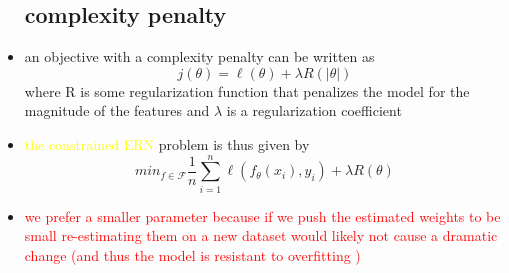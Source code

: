 \documentclass{article}
\begin{document}
\begin{itemize}
\subsection*{complexity penalty}
\item an objective with  a complexity penalty can be written as $$j(\theta)= \ell(\theta)+\lambda R(|\theta|)$$ where R is some regularization function that penalizes the model for the magnitude of the features and $\lambda $ is a regularization coefficient 
\item \textcolor{yellow}{the constrained ERN} problem is thus given by$$min_{f\in \mathcal{F}}\frac{1}{n}\sum_{i=1}^{n}\ell(f_{\theta}(x_i), y_i)+\lambda R(\theta)$$
\item \textcolor{red}{we prefer a smaller parameter  because if we push the estimated weights to be small re-estimating them on a new dataset would likely not cause a dramatic change (and thus the model is resistant to overfitting ) }

\end{itemize}
\end{document}
